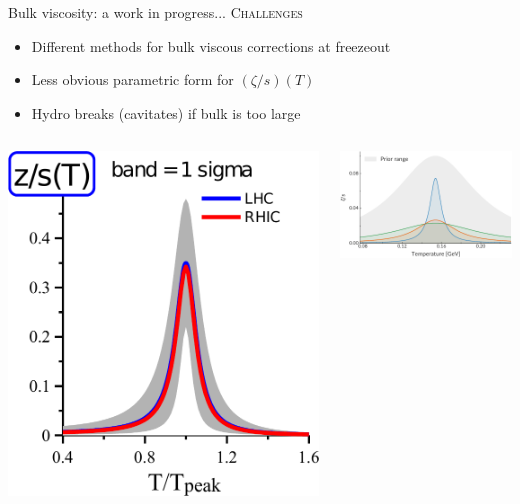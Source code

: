 \documentclass{beamer}
\begin{document}
\begin{frame}{Bulk viscosity: a work in progress...}{}
  \medskip
  {\scshape Challenges}
  \begin{itemize}
    \small
    \item Different methods for bulk viscous corrections at freezeout
    \item Less obvious parametric form for $(\zeta/s)(T)$
    \item Hydro breaks (cavitates) if bulk is too large 
  \end{itemize}
  \vspace{.5cm}

  \begin{columns}[b]
    \begin{column}{.38\textwidth}
      \includegraphics[width=\columnwidth]{gabriel_bulk}
    \end{column}
    \begin{column}{.62\textwidth}
      \includegraphics[width=\columnwidth]{jbernhard_qm2017}\\
    \end{column}
  \end{columns}


\end{frame}
\end{document}

